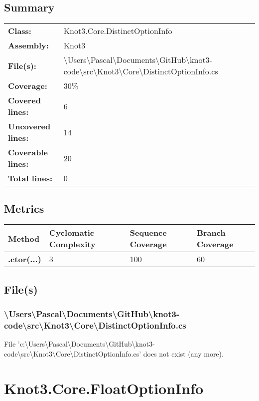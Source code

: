 \documentclass[a4paper,10pt]{article}
\begin{document}
\subsection{Summary}
\begin{longtable}[l]{ll}
\textbf{Class:} & Knot3.Core.DistinctOptionInfo\\
\textbf{Assembly:} & Knot3\\
\textbf{File(s):} & \begin{minipage}[t]{12cm}{\textbackslash Users\textbackslash Pascal\textbackslash Documents\textbackslash GitHub\textbackslash knot3-code\textbackslash src\textbackslash Knot3\textbackslash Core\textbackslash DistinctOptionInfo.cs}\end{minipage} \\
\textbf{Coverage:} & 30\%\\
\textbf{Covered lines:} & 6\\
\textbf{Uncovered lines:} & 14\\
\textbf{Coverable lines:} & 20\\
\textbf{Total lines:} & 0\\
\end{longtable}
\subsection{Metrics}
\begin{longtable}[l]{|l|l|l|l|}
\hline
\textbf{Method} & \textbf{Cyclomatic Complexity} & \textbf{Sequence Coverage} & \textbf{Branch Coverage}\\
\hline
\textbf{.ctor(...)} & 3 & 100 & 60\\
\hline
\end{longtable}
\subsection{File(s)}
\subsubsection{\textbackslash Users\textbackslash Pascal\textbackslash Documents\textbackslash GitHub\textbackslash knot3-code\textbackslash src\textbackslash Knot3\textbackslash Core\textbackslash DistinctOptionInfo.cs}
 File 'c:\textbackslash Users\textbackslash Pascal\textbackslash Documents\textbackslash GitHub\textbackslash knot3-code\textbackslash src\textbackslash Knot3\textbackslash Core\textbackslash DistinctOptionInfo.cs' does not exist (any more).
\newpage
\section{Knot3.Core.FloatOptionInfo}
\end{document}
